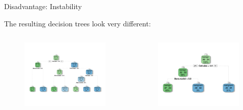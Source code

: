 \documentclass[11pt,compress,t,notes=noshow, xcolor=table]{beamer}
\begin{document}
\begin{vbframe}{Disadvantage: Instability}

The resulting decision trees look very different:

\begin{columns}
\begin{column}{0.5\textwidth}
\begin{figure}
\includegraphics[width=0.99\textwidth]{figure/instability_full.pdf} 
\end{figure}
\end{column}
\begin{column}{0.5\textwidth}
\begin{figure}
\includegraphics[width=0.99\textwidth]{figure/instability_reduced.pdf} 
\end{figure}
\end{column}
\end{columns}

\end{vbframe}
\end{document}
